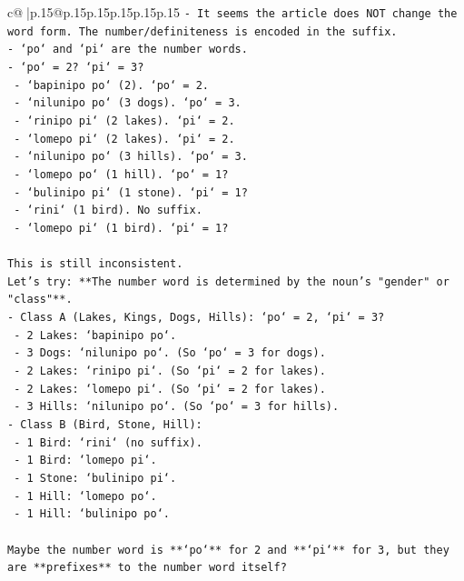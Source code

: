 \documentclass{article}
\begin{document}
{\begin{supertabular}{c@{$\;$}|p{.15\linewidth}@{}p{.15\linewidth}p{.15\linewidth}p{.15\linewidth}p{.15\linewidth}p{.15\linewidth}}
{{{\texttt{{-} It seems the article does NOT change the word form. The number/definiteness is encoded in the suffix.} \\
\texttt{{-} `po` and `pi` are the number words.} \\
\texttt{{-} `po` = 2? `pi` = 3?} \\
\texttt{  {-} `bapinipo po` (2). `po` = 2.} \\
\texttt{  {-} `nilunipo po` (3 dogs). `po` = 3.} \\
\texttt{  {-} `rinipo pi` (2 lakes). `pi` = 2.} \\
\texttt{  {-} `lomepo pi` (2 lakes). `pi` = 2.} \\
\texttt{  {-} `nilunipo po` (3 hills). `po` = 3.} \\
\texttt{  {-} `lomepo po` (1 hill). `po` = 1?} \\
\texttt{  {-} `bulinipo pi` (1 stone). `pi` = 1?} \\
\texttt{  {-} `rini` (1 bird). No suffix.} \\
\texttt{  {-} `lomepo pi` (1 bird). `pi` = 1?} \\
\\ 
\texttt{This is still inconsistent.} \\
\texttt{Let's try: **The number word is determined by the noun's "gender" or "class"**.} \\
\texttt{{-} Class A (Lakes, Kings, Dogs, Hills): `po` = 2, `pi` = 3?} \\
\texttt{  {-} 2 Lakes: `bapinipo po`.} \\
\texttt{  {-} 3 Dogs: `nilunipo po`. (So `po` = 3 for dogs).} \\
\texttt{  {-} 2 Lakes: `rinipo pi`. (So `pi` = 2 for lakes).} \\
\texttt{  {-} 2 Lakes: `lomepo pi`. (So `pi` = 2 for lakes).} \\
\texttt{  {-} 3 Hills: `nilunipo po`. (So `po` = 3 for hills).} \\
\texttt{{-} Class B (Bird, Stone, Hill):} \\
\texttt{  {-} 1 Bird: `rini` (no suffix).} \\
\texttt{  {-} 1 Bird: `lomepo pi`.} \\
\texttt{  {-} 1 Stone: `bulinipo pi`.} \\
\texttt{  {-} 1 Hill: `lomepo po`.} \\
\texttt{  {-} 1 Hill: `bulinipo po`.} \\
\\ 
\texttt{Maybe the number word is **`po`** for 2 and **`pi`** for 3, but they are **prefixes** to the number word itself?} \\
}}}
\end{supertabular}}
\end{document}
